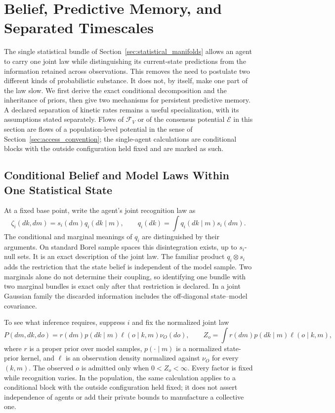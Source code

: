 \section{Belief, Predictive Memory, and Separated Timescales}\label{sec:timescales}

The single statistical bundle of Section~\ref{sec:statistical_manifolds} allows an agent to carry one joint law while distinguishing its current-state predictions from the information retained across observations. This removes the need to postulate two different kinds of probabilistic substance. It does not, by itself, make one part of the law slow. We first derive the exact conditional decomposition and the inheritance of priors, then give two mechanisms for persistent predictive memory. A declared separation of kinetic rates remains a useful specialization, with its assumptions stated separately. Flows of $\mathcal F_V$ or of the consensus potential $\mathcal E$ in this section are flows of a population-level potential in the sense of Section~\ref{sec:access_convention}; the single-agent calculations are conditional blocks with the outside configuration held fixed and are marked as such.

\subsection{Conditional Belief and Model Laws Within One Statistical State}
\label{sec:one_law_conditional_models}

At a fixed base point, write the agent's joint recognition law as
\begin{equation}
\zeta_i(dk,dm)=s_i(dm)q_i(dk\mid m),
\qquad q_i(dk)=\int q_i(dk\mid m)s_i(dm).
\label{eq:one_law_disintegration}
\end{equation}
The conditional and marginal meanings of $q_i$ are distinguished by their arguments. On standard Borel sample spaces this disintegration exists, up to $s_i$-null sets. It is an exact description of the joint law. The familiar product $q_i\otimes s_i$ adds the restriction that the state belief is independent of the model sample. Two marginals alone do not determine their coupling, so identifying one bundle with two marginal bundles is exact only after that restriction is declared. In a joint Gaussian family the discarded information includes the off-diagonal state--model covariance.

To see what inference requires, suppress $i$ and fix the normalized joint law
\begin{equation}
P(dm,dk,do)=r(dm)p(dk\mid m)\ell(o\mid k,m)\nu_O(do),
\qquad
Z_o=\int r(dm)p(dk\mid m)\ell(o\mid k,m),
\label{eq:one_law_generative_joint}
\end{equation}
where $r$ is a proper prior over model samples, $p(\cdot\mid m)$ is a normalized state-prior kernel, and $\ell$ is an observation density normalized against $\nu_O$ for every $(k,m)$. The observed $o$ is admitted only when $0<Z_o<\infty$. Every factor is fixed while recognition varies. In the population, the same calculation applies to a conditional block with the outside configuration held fixed; it does not assert independence of agents or add their private bounds to manufacture a collective one.

